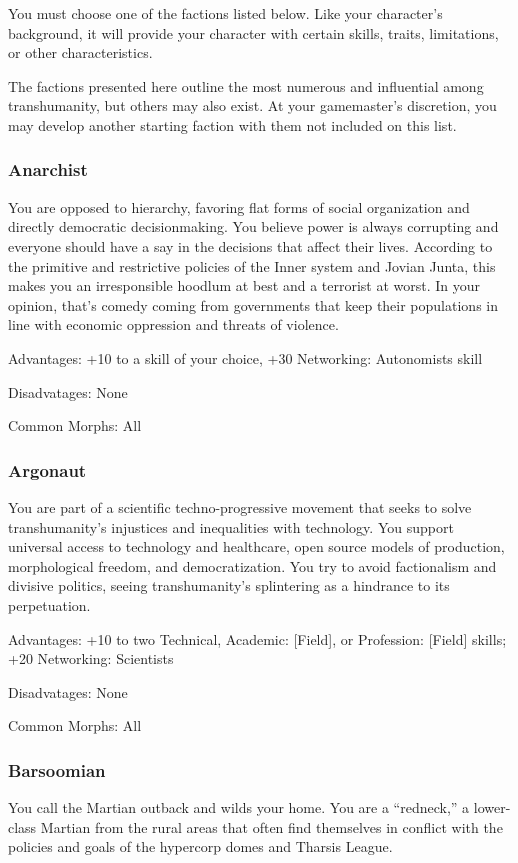You must choose one of the factions listed below.  Like your character’s
background, it will provide your character with certain skills, traits,
limitations, or other characteristics.

The factions presented here outline the most numerous and influential among
transhumanity, but others may also exist. At your gamemaster’s discretion, you
may develop another starting faction with them not included on this list.

\subsubsection{Anarchist}
You are opposed to hierarchy, favoring flat forms of social organization and
directly democratic decisionmaking. You believe power is always corrupting and
everyone should have a say in the decisions that affect their lives. According
to the primitive and restrictive policies of the Inner system and Jovian Junta,
this makes you an irresponsible hoodlum at best and a terrorist at worst. In
your opinion, that’s comedy coming from governments that keep their populations
in line with economic oppression and threats of violence.

Advantages: +10 to a skill of your choice, +30 Networking: Autonomists skill

Disadvatages: None

Common Morphs: All

\subsubsection{Argonaut}
You are part of a scientific techno-progressive movement that seeks to solve
transhumanity’s injustices and inequalities with technology. You support
universal access to technology and healthcare, open source models of
production, morphological freedom, and democratization. You try to avoid
factionalism and divisive politics, seeing transhumanity’s splintering as a
hindrance to its perpetuation.

Advantages: +10 to two Technical, Academic: [Field], or Profession: [Field]
skills; +20 Networking: Scientists

Disadvatages: None

Common Morphs: All

\subsubsection{Barsoomian}
You call the Martian outback and wilds your home.  You are a “redneck,” a
lower-class Martian from the rural areas that often find themselves in conflict
with the policies and goals of the hypercorp domes and Tharsis League.

